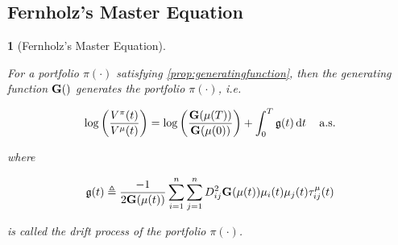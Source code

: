 \documentclass[british]{amsart} \usepackage{lmodern}
\numberwithin{equation}{section} \numberwithin{figure}{section}
\theoremstyle{plain} \newtheorem{thm}{\protect\theoremname}[section]
\theoremstyle{definition} \newtheorem{defn}[thm]{\protect\definitionname}
\theoremstyle{plain} \newtheorem{assumption}[thm]{\protect\assumptionname}
\theoremstyle{plain} \newtheorem{lem}[thm]{\protect\lemmaname}
\theoremstyle{plain} \newtheorem{prop}[thm]{\protect\propositionname}
\theoremstyle{remark} \newtheorem{rem}[thm]{\protect\remarkname}
\theoremstyle{plain} \newtheorem{cor}[thm]{\protect\corollaryname}
\renewcommand{\d}[1]{\mathop{\mathrm{d}{#1}}}
\begin{document}
\subsection{Fernholz's Master Equation}

\begin{lem} [Fernholz's Master Equation]
  \label{lem:masterequationlemma}

  For a portfolio $\pi(\cdot)$ satisfying \ref{prop:generatingfunction}, then the
  generating function $\mathbf{G}()$ generates the portfolio $\pi(\cdot)$, i.e.

  \begin{equation}
    \label{eq:masterequation}
    \log \left( \frac{V^{\pi}(t)}{V^{\mu}(t)} \right) = 
    \log \left( \frac{\G{\mu(T)}}{\G{\mu(0)}} \right) + 
      \int_{0}^{T} \g \d{t}
    \quad \almostsurely
  \end{equation}

  where 

  \begin{equation}
    \mathfrak{g}(t) \triangleq \frac{-1}{2 \mathbf{G}(\mu(t))}
        \sum_{i=1}^{n} \sum_{j=1}^{n} D_{ij}^{2} \mathbf{G}(\mu(t)) 
        \mu_{i}(t) \mu_{j}(t)
        \tau_{ij}^{\mu}(t)
  \end{equation}

  is called the \textit{drift process} of the portfolio $\pi(\cdot)$.

\end{lem}
\end{document}
